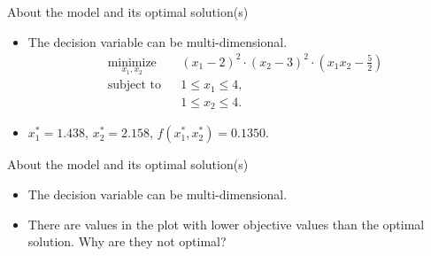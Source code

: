 \documentclass [xcolor=svgnames, handout]{beamer}
\begin{document}
\begin{frame}{About the model and its optimal solution(s)}
    \begin{itemize}[<+->]
        \item The decision variable can be multi-dimensional.
        \begin{equation}
            \begin{aligned}
                & \underset{x_1, x_2}{\text{minimize}}
                & & (x_1-2)^2 \cdot (x_2-3)^2 \cdot \left(x_1 x_2 - \frac52 \right)\\
                & \text{subject to}
                & & 1 \leq x_1 \leq 4, \\
                & & & 1 \leq x_2 \leq 4.
            \end{aligned}
            \label{eq:2D_optimization}
        \end{equation}
        \begin{figure}
            \centering
            
        \end{figure}
        \item $x_1^* = 1.438$, $x_2^* = 2.158$, $f(x_1^*, x_2^*) = 0.1350$.
    \end{itemize}
\end{frame}


\begin{frame}{About the model and its optimal solution(s)}
    \begin{itemize}[<+->]
        \item The decision variable can be multi-dimensional.
        \begin{figure}
            \centering
            
        \end{figure}
        \item There are values in the plot with lower objective values than the optimal solution. Why are they not optimal?
    \end{itemize}
\end{frame}
\end{document}
